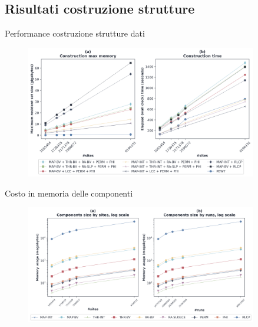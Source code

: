 \documentclass[]{beamer}
\begin{document}
\subsection{Risultati costruzione strutture}
\begin{frame}{Performance costruzione strutture dati}
  \begin{figure}[H]
    \centering
    \includegraphics[width=0.9\textwidth]{img/make_time_mem_paper.png}
  \end{figure}
\end{frame}
\begin{frame}{Costo in memoria delle componenti}
  \begin{figure}[H]
    \centering
    \includegraphics[width=0.9\textwidth]{img/comp_mem.png}
  \end{figure}
\end{frame}
\end{document}
